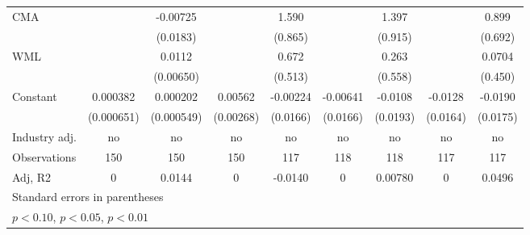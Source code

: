 {\begin{tabular}{l*{8}{c}}
CMA                 &                     &    -0.00725         &                     &       1.590\sym{*}  &                     &       1.397         &                     &       0.899         \\
                    &                     &    (0.0183)         &                     &     (0.865)         &                     &     (0.915)         &                     &     (0.692)         \\
WML                 &                     &      0.0112\sym{*}  &                     &       0.672         &                     &       0.263         &                     &      0.0704         \\
                    &                     &   (0.00650)         &                     &     (0.513)         &                     &     (0.558)         &                     &     (0.450)         \\
Constant            &    0.000382         &    0.000202         &     0.00562\sym{**} &    -0.00224         &    -0.00641         &     -0.0108         &     -0.0128         &     -0.0190         \\
                    &  (0.000651)         &  (0.000549)         &   (0.00268)         &    (0.0166)         &    (0.0166)         &    (0.0193)         &    (0.0164)         &    (0.0175)         \\
\hline
Industry adj.       &          no         &          no         &          no         &          no         &          no         &          no         &          no         &          no         \\
Observations        &         150         &         150         &         150         &         117         &         118         &         118         &         117         &         117         \\
Adj, R2             &           0         &      0.0144         &           0         &     -0.0140         &           0         &     0.00780         &           0         &      0.0496         \\
\hline\hline
\multicolumn{9}{l}{\footnotesize Standard errors in parentheses}\\
\multicolumn{9}{l}{\footnotesize \sym{*} \(p<0.10\), \sym{**} \(p<0.05\), \sym{***} \(p<0.01\)}\\
\end{tabular}
}
